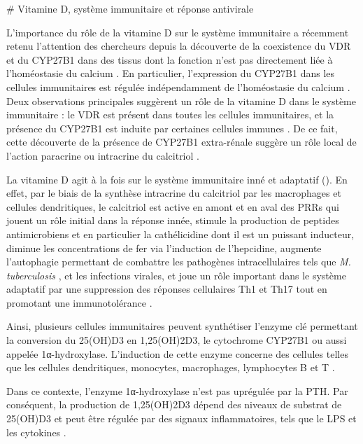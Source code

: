 \documentclass[
  a4paper,
  DIV=11,
  numbers=noendperiod,
  listof=totoc]{scrreprt}
\begin{document}
\newpage{}

\ac{}\# Vitamine D, système immunitaire et réponse antivirale

L'importance du rôle de la vitamine D sur le système immunitaire a
récemment retenu l'attention des chercheurs depuis la découverte de la
coexistence du \ac{VDR} et du \ac{CYP27B1} dans des tissus dont la
fonction n'est pas directement liée à l'homéostasie du calcium
\autocite{Zehnder.2001}. En particulier, l'expression du \ac{CYP27B1}
dans les cellules immunitaires est régulée indépendamment de
l'homéostasie du calcium \autocite{White.2022}. Deux observations
principales suggèrent un rôle de la vitamine D dans le système
immunitaire : le \ac{VDR} est présent dans toutes les cellules
immunitaires, et la présence du \ac{CYP27B1} est induite par certaines
cellules immunes \autocite{Giannini.2022}. De ce fait, cette découverte
de la présence de CYP27B1 extra-rénale suggère un rôle local de l'action
paracrine ou intracrine du calcitriol
\autocite{Hewison.2007,Bishop.2021}.

La vitamine D agit à la fois sur le système immunitaire inné et
adaptatif (). En effet, par le biais de la
synthèse intracrine du calcitriol par les macrophages et cellules
dendritiques, le calcitriol est active en amont et en aval des \acp{PRR}
qui jouent un rôle initial dans la réponse innée, stimule la production
de peptides antimicrobiens et en particulier la cathélicidine dont il
est un puissant inducteur, diminue les concentrations de fer via
l'induction de l'hepcidine, augmente l'autophagie permettant de
combattre les pathogènes intracellulaires tels que \emph{M.
tuberculosis} \autocite{Liu.2006}, et les infections virales, et joue un
rôle important dans le système adaptatif par une suppression des
réponses cellulaires \ac{Th1} et \ac{Th17} tout en promotant une
immunotolérance \autocite{Bishop.2021,Ismailova.2022}.

Ainsi, plusieurs cellules immunitaires peuvent synthétiser l'enzyme clé
permettant la conversion du \ac{25(OH)D3} en \ac{1,25(OH)2D3}, le
cytochrome \ac{CYP27B1} ou aussi appelée 1α-hydroxylase. L'induction de
cette enzyme concerne des cellules telles que les cellules dendritiques,
monocytes, macrophages, lymphocytes B et T
\autocite{Giannini.2022,Dankers.2017}.

Dans ce contexte, l'enzyme 1α-hydroxylase n'est pas uprégulée par la
\ac{PTH}. Par conséquent, la production de \ac{1,25(OH)2D3} dépend des
niveaux de substrat de \ac{25(OH)D3} et peut être régulée par des
signaux inflammatoires, tels que le \ac{LPS} et les cytokines
\autocite{Giannini.2022}.
\end{document}
